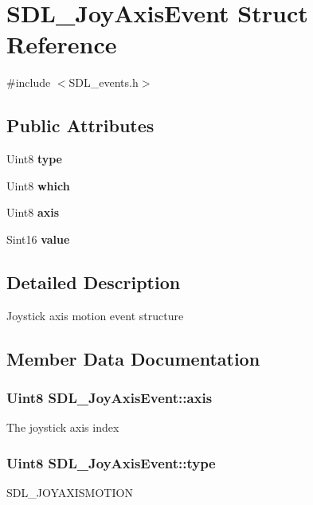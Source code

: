 \section{S\+D\+L\+\_\+\+Joy\+Axis\+Event Struct Reference}
\label{struct_s_d_l___joy_axis_event}


{\ttfamily \#include $<$S\+D\+L\+\_\+events.\+h$>$}

\subsection*{Public Attributes}
\begin{DoxyCompactItemize}
\item 
Uint8 {\bf type}
\item 
Uint8 {\bf which}
\item 
Uint8 {\bf axis}
\item 
Sint16 {\bf value}
\end{DoxyCompactItemize}


\subsection{Detailed Description}
Joystick axis motion event structure 

\subsection{Member Data Documentation}
\subsubsection[{axis}]{\setlength{\rightskip}{0pt plus 5cm}Uint8 S\+D\+L\+\_\+\+Joy\+Axis\+Event\+::axis}\label{struct_s_d_l___joy_axis_event_a0beac2fb161e45771c424bd0b6daeabb}
The joystick axis index 
\subsubsection[{type}]{\setlength{\rightskip}{0pt plus 5cm}Uint8 S\+D\+L\+\_\+\+Joy\+Axis\+Event\+::type}\label{struct_s_d_l___joy_axis_event_ab49b38845a4326b1591f7c8fadc6e5ad}
S\+D\+L\+\_\+\+J\+O\+Y\+A\+X\+I\+S\+M\+O\+T\+I\+O\+N 
